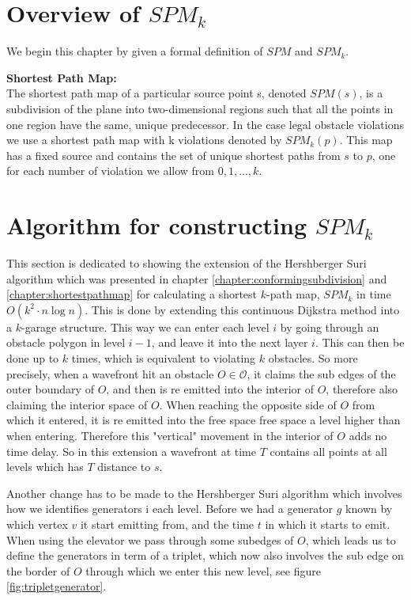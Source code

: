 \section{Overview of $SPM_k$}

We begin this chapter by given a formal definition of $SPM$ and $SPM_k$.

\begin{mydef}
	\textbf{Shortest Path Map:} \\ 
	The shortest path map  of a
	particular source point s, denoted $SPM(s)$, is a subdivision of the plane
	into two-dimensional regions such that all the points in one region have the
	same, unique predecessor\cite{HershbergerS99}. In the case legal obstacle
	violations we use a shortest path map with k violations denoted by
	$SPM_k(p)$. This map has a fixed source and contains the set of unique
	shortest paths from $s$ to $p$, one for each number of violation we allow
	from $0,1,...,k$. 
\end{mydef}



\section{Algorithm for constructing $SPM_k$}

This section is dedicated to showing the extension of the Hershberger Suri algorithm which was presented in chapter 
\ref{chapter:conformingsubdivision} and \ref{chapter:shortestpathmap} for calculating a shortest $k$-path map, $SPM_k$ in time $O(k^2 \cdot 
n \log n)$. This is done by extending this continuous Dijkstra method into a $k$-garage structure. This way we can enter each level $i$ by 
going through an obstacle polygon in level $i-1$, and leave it into the next layer $i$. This can then be done up to $k$ times, which is 
equivalent to violating $k$ obstacles. So more precisely, when a wavefront hit an obstacle $O \in \mathcal{O}$, it claims the sub edges of 
the outer boundary of $O$, and then is re emitted into the interior of $O$, therefore also claiming the interior space of $O$. When reaching
the opposite side of $O$ from which it entered, it is re emitted into the free space free space a level higher than when entering. Therefore
this "vertical" movement in the interior of $O$ adds no time delay. So in this extension a wavefront at time $T$ contains all points at all 
levels which has $T$ distance to $s$. 

Another change has to be made to the Hershberger Suri algorithm which involves how we identifies generators i each level. Before we had a 
generator $g$ known by which vertex $v$ it start emitting from, and the time $t$ in which it starts to emit. When using the elevator we pass
through some subedges of $O$, which leads us to define the generators in term of a triplet, which now also involves the sub edge on the 
border of $O$ through which we enter this new level, see figure \ref{fig:tripletgenerator}.

